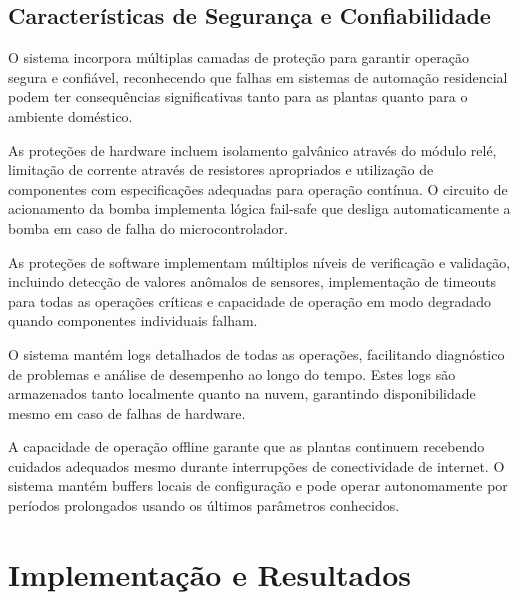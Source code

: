 \documentclass[twoside,english,brazilian]{UNISINOSmonografia}
\begin{document}

\section{Características de Segurança e Confiabilidade}

O sistema incorpora múltiplas camadas de proteção para garantir operação segura e confiável, reconhecendo que falhas em sistemas de automação residencial podem ter consequências significativas tanto para as plantas quanto para o ambiente doméstico.

As proteções de hardware incluem isolamento galvânico através do módulo relé, limitação de corrente através de resistores apropriados e utilização de componentes com especificações adequadas para operação contínua. O circuito de acionamento da bomba implementa lógica fail-safe que desliga automaticamente a bomba em caso de falha do microcontrolador.

As proteções de software implementam múltiplos níveis de verificação e validação, incluindo detecção de valores anômalos de sensores, implementação de timeouts para todas as operações críticas e capacidade de operação em modo degradado quando componentes individuais falham.

O sistema mantém logs detalhados de todas as operações, facilitando diagnóstico de problemas e análise de desempenho ao longo do tempo. Estes logs são armazenados tanto localmente quanto na nuvem, garantindo disponibilidade mesmo em caso de falhas de hardware.

A capacidade de operação offline garante que as plantas continuem recebendo cuidados adequados mesmo durante interrupções de conectividade de internet. O sistema mantém buffers locais de configuração e pode operar autonomamente por períodos prolongados usando os últimos parâmetros conhecidos.

\chapter{Implementação e Resultados}
\end{document}
